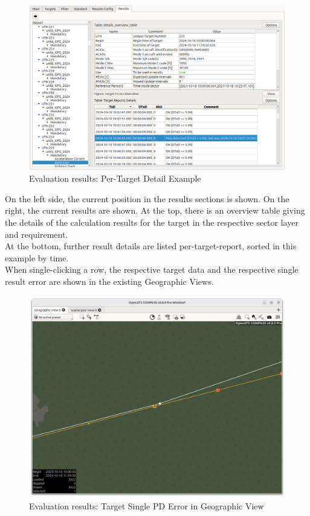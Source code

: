\begin{figure}[H]
  \hspace*{-2cm}
    \includegraphics[width=18cm,frame]{figures/eval_results_target_example.png}
  \caption{Evaluation results: Per-Target Detail Example}
\end{figure}

On the left side, the current position in the results sections is shown. On the right, the current results are shown. At the top, there is an overview table giving the details of the calculation results for the target in the respective sector layer and requirement. \\

At the bottom, further result details are listed per-target-report, sorted in this example by time. \\

When single-clicking a row, the respective target data and the respective single result error are shown in the existing Geographic Views.

\begin{figure}[H]
  \hspace*{-2.5cm}
    \includegraphics[width=19cm]{figures/eval_results_pd_single_tr_geoview.png}
  \caption{Evaluation results: Target Single PD Error in Geographic View}
\end{figure}

